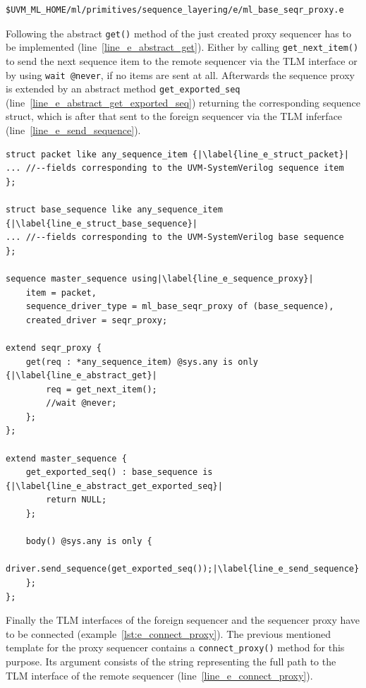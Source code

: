 \smallskip
\begin{lstlisting}
$UVM_ML_HOME/ml/primitives/sequence_layering/e/ml_base_seqr_proxy.e
\end{lstlisting}
\smallskip
Following the abstract \lstinline$get()$ method of the just created proxy sequencer has to be implemented (line~\ref{line_e_abstract_get}). Either by calling \lstinline$get_next_item()$ to send the next sequence item to the remote sequencer via the TLM interface or by using \lstinline$wait @never$, if no items are sent at all. Afterwards the sequence proxy is extended by an abstract method \lstinline$get_exported_seq$ (line~\ref{line_e_abstract_get_exported_seq}) returning the corresponding sequence struct, which is after that sent to the foreign sequencer via the TLM inferface (line~\ref{line_e_send_sequence}).
\lstset{language=e, numbers = left, escapechar=|, breaklines=true}
\begin{lstlisting}[frame=htrbl, caption={\textit{e}: creating a proxy sequencer},
label={lst:e_proxy_sequencer}]
struct packet like any_sequence_item {|\label{line_e_struct_packet}|
... //--fields corresponding to the UVM-SystemVerilog sequence item
};

struct base_sequence like any_sequence_item {|\label{line_e_struct_base_sequence}|
... //--fields corresponding to the UVM-SystemVerilog base sequence
};

sequence master_sequence using|\label{line_e_sequence_proxy}|
    item = packet,
    sequence_driver_type = ml_base_seqr_proxy of (base_sequence),
    created_driver = seqr_proxy;

extend seqr_proxy {
    get(req : *any_sequence_item) @sys.any is only {|\label{line_e_abstract_get}|
        req = get_next_item();
        //wait @never;
    };
};

extend master_sequence {
    get_exported_seq() : base_sequence is {|\label{line_e_abstract_get_exported_seq}|
        return NULL;
    };

    body() @sys.any is only {
        driver.send_sequence(get_exported_seq());|\label{line_e_send_sequence}|
    };
};
\end{lstlisting}
Finally the TLM interfaces of the foreign sequencer and the sequencer proxy have to be connected (example~\ref{lst:e_connect_proxy}). The previous mentioned template for the proxy sequencer contains a \lstinline$connect_proxy()$ method for this purpose. Its argument consists of the string representing the full path to the TLM interface of the remote sequencer (line~\ref{line_e_connect_proxy}).
